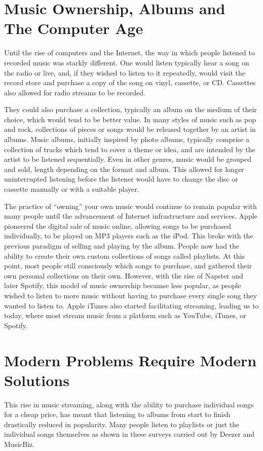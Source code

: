 \documentclass[a4paper, 12pt]{report}
\begin{document}
\section[Music Ownership, Albums and The Computer Age]{Music Ownership, Albums and \\ The Computer Age}
Until the rise of computers and the Internet, the way in which people listened to recorded music was starkly different. One would listen typically hear a song on the radio or live, and,
if they wished to listen to it repeatedly, would visit the record store and purchase a copy of the song on vinyl, cassette, or CD. 
Cassettes also allowed for radio streams to be recorded.

They could also purchase a collection, typically an album on the medium of their choice, which would tend to be better value.
In many styles of music such as pop and rock, collections of pieces or songs would be released together by an artist in albums.
Music albums, initially inspired by photo albums, typically comprise a collection of tracks which tend to cover a theme or idea, and are intended by the artist to be listened sequentially.
Even in other genres, music would be grouped and sold, length depending on the format and album. This allowed for longer uninterrupted listening before the
listener would have to change the disc or cassette manually or with a suitable player.

The practice of ``owning'' your own music would continue to remain popular with many people until the advancement of Internet infrastructure and services.
Apple pioneered the digital sale of music online, allowing songs to be purchased individually, to be played on MP3 players such as the iPod.
This broke with the previous paradigm of selling and playing by the album. People now had the ability to create their own custom collections of songs called playlists.
At this point, most people still consciously which songs to purchase, and gathered their own personal collections on their own.
However, with the rise of Napster and later Spotify, this model of music ownership becamse less popular, as people wished to listen to more music without having
to purchase every single song they wanted to listen to. Apple iTunes also started facilitating streaming, leading us to today, where most stream music 
from a platform such as YouTube, iTunes, or Spotify.

\section[Modern Problems Require Modern Solutions]{Modern Problems Require Modern \\ Solutions}
This rise in music streaming, along with the ability to purchase individual songs for a cheap price, has meant that listening to albums from start to finish
drastically reduced in popularity. Many people listen to playlists or just the individual songs themselves as shown in these surveys
carried out by Deezer\cite{deezer} and MusicBiz\cite{musicbiz}.
\end{document}
